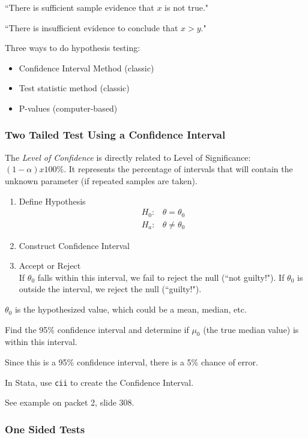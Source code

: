 \documentclass[11pt, oneside]{article}   	%
\begin{document}
``There is sufficient sample evidence that $x$ is not true." 

``There is insufficient evidence to conclude that $x > y$."

Three ways to do hypothesis testing:
\begin{itemize}
\item{Confidence Interval Method (classic)}
\item{Test statistic method (classic)}
\item{P-values (computer-based)}
\end{itemize}

\subsubsection{Two Tailed Test Using a Confidence Interval}

The \textit{Level of Confidence} is directly related to Level of Significance: $(1-\alpha) x 100\%$. It represents the percentage of intervals that will contain the unknown parameter (if repeated samples are taken).

\begin{enumerate}
\item{Define Hypothesis}
\begin{align*}
H_0 :& \theta = \theta_0 \\
H_a :& \theta \neq \theta_0
\end{align*}
\item{Construct Confidence Interval}
\item{Accept or Reject}\\
If $\theta_0$ falls within this interval, we fail to reject the null (``not guilty!"). If $\theta_0$ is outside the interval, we reject the null (``guilty!").
\end{enumerate}

$\theta_0$ is the hypothesized value, which could be a mean, median, etc.

Find the 95\% confidence interval and determine if $\mu_0$ (the true median value) is within this interval.

Since this is a 95\% confidence interval, there is a 5\% chance of error.

In Stata, use \texttt{cii} to create the Confidence Interval.

See example on packet 2, slide 308.

\subsubsection{One Sided Tests}
\end{document}
